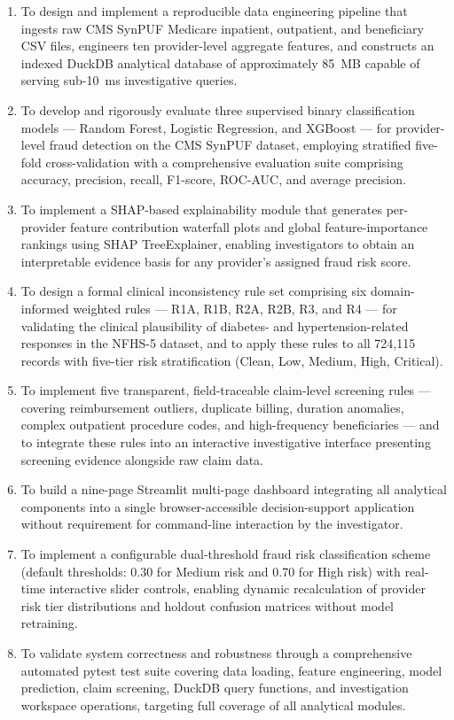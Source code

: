 \begin{enumerate}
    \item To design and implement a reproducible data engineering pipeline that ingests raw CMS SynPUF Medicare inpatient, outpatient, and beneficiary CSV files, engineers ten provider-level aggregate features, and constructs an indexed DuckDB analytical database of approximately 85~MB capable of serving sub-10~ms investigative queries.

    \item To develop and rigorously evaluate three supervised binary classification models --- Random Forest, Logistic Regression, and XGBoost --- for provider-level fraud detection on the CMS SynPUF dataset, employing stratified five-fold cross-validation with a comprehensive evaluation suite comprising accuracy, precision, recall, F1-score, ROC-AUC, and average precision.

    \item To implement a SHAP-based explainability module that generates per-provider feature contribution waterfall plots and global feature-importance rankings using SHAP TreeExplainer, enabling investigators to obtain an interpretable evidence basis for any provider's assigned fraud risk score.

    \item To design a formal clinical inconsistency rule set comprising six domain-informed weighted rules --- R1A, R1B, R2A, R2B, R3, and R4 --- for validating the clinical plausibility of diabetes- and hypertension-related responses in the NFHS-5 dataset, and to apply these rules to all 724,115 records with five-tier risk stratification (Clean, Low, Medium, High, Critical).

    \item To implement five transparent, field-traceable claim-level screening rules --- covering reimbursement outliers, duplicate billing, duration anomalies, complex outpatient procedure codes, and high-frequency beneficiaries --- and to integrate these rules into an interactive investigative interface presenting screening evidence alongside raw claim data.

    \item To build a nine-page Streamlit multi-page dashboard integrating all analytical components into a single browser-accessible decision-support application without requirement for command-line interaction by the investigator.

    \item To implement a configurable dual-threshold fraud risk classification scheme (default thresholds: 0.30 for Medium risk and 0.70 for High risk) with real-time interactive slider controls, enabling dynamic recalculation of provider risk tier distributions and holdout confusion matrices without model retraining.

    \item To validate system correctness and robustness through a comprehensive automated pytest test suite covering data loading, feature engineering, model prediction, claim screening, DuckDB query functions, and investigation workspace operations, targeting full coverage of all analytical modules.
\end{enumerate}

